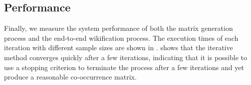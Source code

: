 
\subsection{Performance}
Finally, we measure the system performance
of both the matrix generation process and the end-to-end wikification process.
The execution times of each iteration with different sample sizes are shown
in .  shows that the iterative method
converges quickly after a few iterations, indicating that it is possible to
use a stopping criterion to terminate the process after a few iterations
and yet produce a reasonable co-occurrence matrix.

